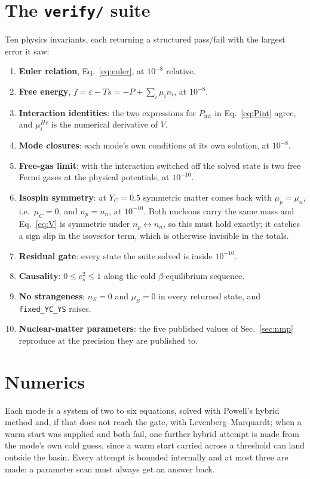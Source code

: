 \documentclass[aps,prc,onecolumn,superscriptaddress,nofootinbib,10pt]{revtex4-2}
\newcommand{\nS}{n_S}
\newcommand{\muC}{\mu_C}
\newcommand{\muS}{\mu_S}
\newcommand{\muHv}[1]{\mu^{Hv}_{#1}}
\begin{document}
\section{The \texttt{verify/} suite}
\label{sec:verify}

Ten physics invariants, each returning a structured pass/fail with the largest
error it saw:
%
\begin{enumerate}
\item \textbf{Euler relation}, Eq.~\eqref{eq:euler}, at $10^{-8}$ relative.
\item \textbf{Free energy}, $f = \varepsilon - Ts = -P + \sum_i \mu_i n_i$, at
      $10^{-8}$.
\item \textbf{Interaction identities}: the two expressions for
      $P_{\mathrm{int}}$ in Eq.~\eqref{eq:Pint} agree, and $\muHv{i}$ is the
      numerical derivative of $V$.
\item \textbf{Mode closures}: each mode's own conditions at its own solution,
      at $10^{-8}$.
\item \textbf{Free-gas limit}: with the interaction switched off the solved
      state is two free Fermi gases at the physical potentials, at $10^{-10}$.
\item \textbf{Isospin symmetry}: at $Y_C = 0.5$ symmetric matter comes back
      with $\mu_p = \mu_n$, i.e.\ $\muC = 0$, and $n_p = n_n$, at $10^{-10}$.
      Both nucleons carry the same mass and Eq.~\eqref{eq:V} is symmetric
      under $n_p \leftrightarrow n_n$, so this must hold exactly; it catches a
      sign slip in the isovector term, which is otherwise invisible in the
      totals.
\item \textbf{Residual gate}: every state the suite solved is inside
      $10^{-10}$.
\item \textbf{Causality}: $0 \le c_s^2 \le 1$ along the cold
      $\beta$-equilibrium sequence.
\item \textbf{No strangeness}: $\nS = 0$ and $\muS = 0$ in every returned
      state, and \texttt{fixed\_YC\_YS} raises.
\item \textbf{Nuclear-matter parameters}: the five published values of
      Sec.~\ref{sec:nmp} reproduce at the precision they are published to.
\end{enumerate}

\section{Numerics}

Each mode is a system of two to six equations, solved with Powell's hybrid
method and, if that does not reach the gate, with Levenberg--Marquardt; when a
warm start was supplied and both fail, one further hybrid attempt is made from
the mode's own cold guess, since a warm start carried across a threshold can
land outside the basin. Every attempt is bounded internally and at most three
are made: a parameter scan must always get an answer back.
\end{document}
